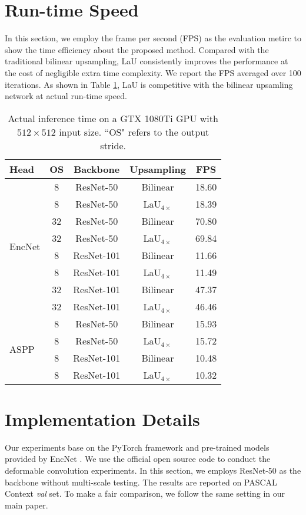 \documentclass[10pt,twocolumn,letterpaper]{article}
\begin{document}
{\small


}

\appendix

\section{Run-time Speed}
In this section, we employ the frame per second (FPS) as the evaluation metirc to show the time efficiency about the proposed method. Compared with the traditional bilinear upsampling, LaU consistently improves the performance at the cost of negligible extra time complexity. We report the FPS averaged over 100 iterations.  As shown in Table \ref{fps}, LaU is competitive with the bilinear upsamling network at actual run-time speed.

\begin{table}[th]
  \caption{Actual inference time on a GTX 1080Ti GPU with $512\times512$ input size. ``OS" refers to the output stride. }
  \label{sample-table}
  \centering
\begin{tabular}{l | cccc}
\hline 
    Head     &   OS   & Backbone &  Upsampling & FPS\\
\hline   
\hline
\multirow{8}{*}{EncNet \cite{EncNet}} & 8 & ResNet-50 & Bilinear & 18.60\\
 & 8 & ResNet-50 & LaU$_{4\times}$ & 18.39\\
\cline{2-5}
& 32 & ResNet-50 & Bilinear & 70.80\\
& 32 & ResNet-50 & LaU$_{4\times}$ & 69.84\\
\cline{2-5}
& 8 & ResNet-101 & Bilinear & 11.66\\
 & 8 & ResNet-101 & LaU$_{4\times}$ & 11.49\\
\cline{2-5}
& 32 & ResNet-101 & Bilinear & 47.37\\
& 32 & ResNet-101 & LaU$_{4\times}$ & 46.46\\
\hline 
\hline 
\multirow{4}{*}{ASPP \cite{ASPP}} & 8 & ResNet-50 & Bilinear & 15.93\\
 & 8 & ResNet-50 & LaU$_{4\times}$ & 15.72\\
\cline{2-5}
& 8 & ResNet-101 & Bilinear & 10.48\\
& 8 & ResNet-101 & LaU$_{4\times}$ & 10.32\\
\hline 
\hline 
  \end{tabular}
\label{fps}
\end{table}

\section{Implementation Details}
Our experiments base on the PyTorch framework \cite{paszke2017automatic} and pre-trained models provided by EncNet \cite{EncNet}. We use the official open source code \cite{ZhuHLD19} to conduct the deformable convolution experiments. In this section, we employs ResNet-50 as the backbone without multi-scale testing. The results are reported on PASCAL Context \textit{val} set. To make a fair comparison, we follow the same setting in our main paper.
\end{document}
